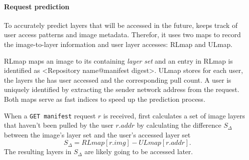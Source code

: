 \paragraph{Request prediction}
%
%

To accurately predict layers that will be accessed in the future, \sysname keeps
track of user access patterns and image metadata.
Therefor, it uses two maps to record the image-to-layer information
and user layer accesses: RLmap and ULmap.
%
%

RLmap maps an image to its containing \emph{layer set} and an entry in RLmap
is identified as \textless{}Repository name@manifest digest\textgreater.
%
%
ULmap stores for each user, the layers the has user accessed and the corresponding pull count.
A user is uniquely identified by extracting the sender network address from the request.
%
Both maps serve as fast indices to speed up the prediction process.

When a \texttt{GET manifest} request $r$ is received,
\sysname first calculates a set of image layers that haven't been pulled by the user $r.addr$ 
by calculating the difference $S_{\Delta}$ between the image's layer set and the user's accessed layer set
%
\begin{equation*}
S_{\Delta} = RLmap[r.img] - ULmap[r.addr].
\end{equation*}
%
The resulting layers in $S_{\Delta}$ are likely going to be accessed later.

